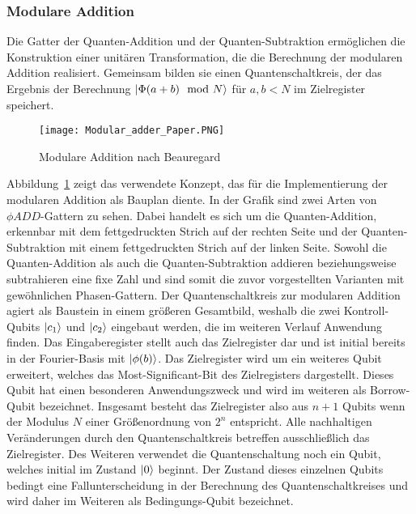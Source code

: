 \subsubsection{Modulare Addition} \label{sub:modulareAddition}
Die Gatter der Quanten-Addition und der Quanten-Subtraktion ermöglichen die Konstruktion einer unitären Transformation, 
die die Berechnung der modularen Addition realisiert.
Gemeinsam bilden sie einen Quantenschaltkreis, 
der das Ergebnis der Berechnung \(\ket{\Phi(a+b)\mod N}\) für \(a, b < N\) im Zielregister speichert.

\begin{figure}[H]
  \caption{Modulare Addition nach Beauregard~\cite{beauregard2003circuit}}
  \label{fig:modulare_addition_paper}
  \texttt{[image: Modular\_adder\_Paper.PNG]}
  \centering
  \end{figure}
Abbildung~\ref{fig:modulare_addition_paper} zeigt das verwendete Konzept, 
das für die Implementierung der modularen Addition als Bauplan diente.
In der Grafik sind zwei Arten von \(\phi ADD\)-Gattern zu sehen.
Dabei handelt es sich um die Quanten-Addition, erkennbar mit dem fettgedruckten Strich auf der rechten Seite und 
der Quanten-Subtraktion mit einem fettgedruckten Strich auf der linken Seite.
Sowohl die Quanten-Addition als auch die Quanten-Subtraktion addieren beziehungsweise subtrahieren eine fixe Zahl und 
sind somit die zuvor vorgestellten Varianten mit gewöhnlichen Phasen-Gattern.
Der Quantenschaltkreis zur modularen Addition agiert als Baustein in einem größeren Gesamtbild, 
weshalb die zwei Kontroll-Qubits \(\ket{c_1}\) und \(\ket{c_2}\) eingebaut werden, 
die im weiteren Verlauf Anwendung finden.
Das Eingaberegister stellt auch das Zielregister dar und 
ist initial bereits in der Fourier-Basis mit \(\ket{\phi(b)}\).
Das Zielregister wird um ein weiteres Qubit erweitert, 
welches das Most-Significant-Bit des Zielregisters dargestellt.
Dieses Qubit hat einen besonderen Anwendungszweck und wird im weiteren als Borrow-Qubit bezeichnet.
Insgesamt besteht das Zielregister also aus \(n+1\) Qubits wenn der Modulus \(N\) einer Größenordnung von \(2^n\) entspricht.
Alle nachhaltigen Veränderungen durch den Quantenschaltkreis betreffen ausschließlich das Zielregister.
Des Weiteren verwendet die Quantenschaltung noch ein Qubit, welches initial im Zustand \(\ket{0}\) beginnt.
Der Zustand dieses einzelnen Qubits bedingt eine Fallunterscheidung in der Berechnung des Quantenschaltkreises und 
wird daher im Weiteren als Bedingungs-Qubit bezeichnet. 

